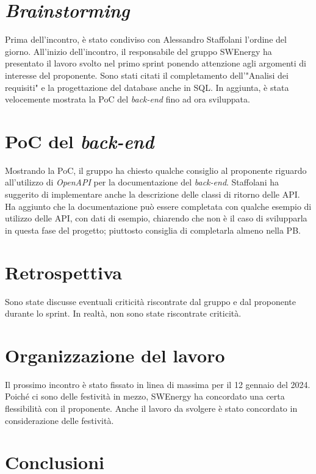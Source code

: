 \section{\textit{Brainstorming}}

Prima dell'incontro, è stato condiviso con Alessandro Staffolani l'ordine del giorno. 
All'inizio dell'incontro, il
responsabile del gruppo SWEnergy ha presentato il lavoro svolto nel primo
sprint ponendo attenzione agli argomenti di interesse del proponente. Sono stati
citati il completamento dell'"Analisi dei requisiti" e la progettazione del
database anche in SQL. In aggiunta, è stata velocemente mostrata la PoC del
\textit{back-end} fino ad ora sviluppata.

\section{PoC del \textit{back-end}}

Mostrando la PoC, il gruppo ha chiesto qualche consiglio al proponente riguardo
all'utilizzo di \textit{OpenAPI} per la documentazione del \textit{back-end}.
Staffolani ha suggerito di implementare anche la descrizione delle classi di
ritorno delle API. Ha aggiunto che la documentazione può essere completata con
qualche esempio di utilizzo delle API, con dati di esempio, chiarendo che non è
il caso di svilupparla in questa fase del progetto; piuttosto consiglia di
completarla almeno nella PB.

\section{Retrospettiva}

Sono state discusse eventuali criticità riscontrate dal gruppo e dal proponente
durante lo sprint. In realtà, non sono state riscontrate criticità.

\section{Organizzazione del lavoro}

Il prossimo incontro è stato fissato in linea di massima per il 12 gennaio del
2024. Poiché ci sono delle festività in mezzo, SWEnergy ha concordato una certa
flessibilità con il proponente. Anche il lavoro da svolgere è stato concordato
in considerazione delle festività.

\section{Conclusioni}


